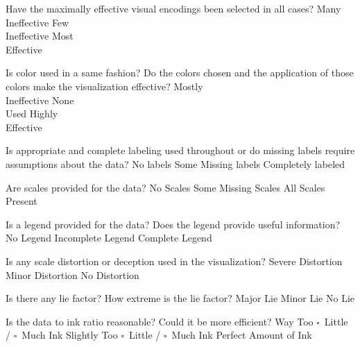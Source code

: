 \documentclass[a4paper,12pt]{article}
\begin{document}
	{Have the maximally effective visual encodings been selected in all cases? }
    {\choice Many\\Ineffective}
    {\choice Few\\Ineffective}
    {\choice Most\\Effective} 
        
	{Is color used in a same fashion? Do the colors chosen and the application 
    	of those colors make the visualization effective?}
    {\choice Mostly\\Ineffective}
    {\choice None\\Used}
    {\choice Highly\\Effective} 

\EndTable  

\vspace{15pt}


   	{Is appropriate and complete labeling used throughout or do 
      	missing labels require assumptions about the data?}
    {\choice No labels}
    {\choice Some Missing labels}
    {\choice Completely labeled} 
        
   	{Are scales provided for the data?}
	{\choice No Scales}
	{\choice Some Missing Scales}
	{\choice All Scales Present} 

	{Is a legend provided for the data? Does the legend provide useful 
    	information?}
	{\choice No Legend}
	{\choice Incomplete Legend}
	{\choice Complete Legend} 
        
        
\EndTable  



	{Is any scale distortion or deception used in the visualization?}	
	{\choice Severe Distortion}
	{\choice Minor Distortion}
	{\choice No Distortion} 
        
	{Is there any lie factor? How extreme is the lie factor?}
	{\choice Major Lie}
	{\choice Minor Lie}
	{\choice No Lie} 

	{Is the data to ink ratio reasonable? Could it be more efficient?}
	{Way Too $\square$~Little / $\square$~Much Ink}
	{Slightly Too $\square$~Little / $\square$~Much Ink}
	{\choice Perfect Amount of Ink} 
        
\end{document}
